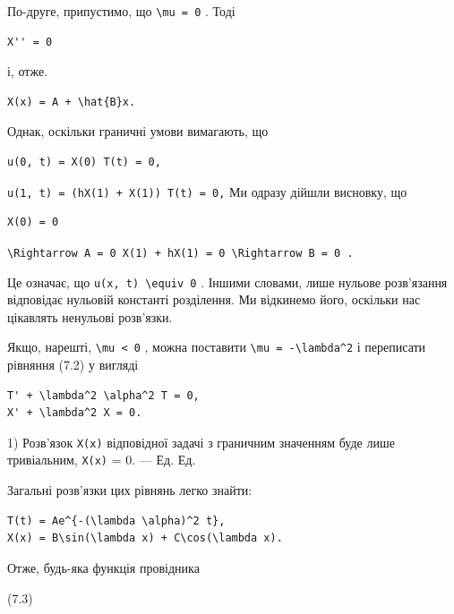 \documentclass[
  ukrainian,
]{article}
\begin{document}
По-друге, припустимо, що \texttt{\textbackslash{}mu\ =\ 0} . Тоді

\begin{verbatim}
X'' = 0
\end{verbatim}

і, отже.

\begin{verbatim}
X(x) = A + \hat{B}x.
\end{verbatim}

Однак, оскільки граничні умови вимагають, що

\begin{verbatim}
u(0, t) = X(0) T(t) = 0,
\end{verbatim}

\texttt{u(1,\ t)\ =\ (hX(1)\ +\ X\textquotesingle{}(1))\ T(t)\ =\ 0,} Ми
одразу дійшли висновку, що

\begin{verbatim}
X(0) = 0
\end{verbatim}

\texttt{\textquotesingle{}\textbackslash{}Rightarrow\ A\ =\ 0\textquotesingle{}\ \textquotesingle{}X\textquotesingle{}(1)\ +\ hX(1)\ =\ 0\textquotesingle{}\ \textquotesingle{}\textbackslash{}Rightarrow\ B\ =\ 0\textquotesingle{}\ .}

Це означає, що \texttt{u(x,\ t)\ \textbackslash{}equiv\ 0} . Іншими
словами, лише нульове розв'язання відповідає нульовій константі
розділення. Ми відкинемо його, оскільки нас цікавлять ненульові
розв'язки.

Якщо, нарешті, \texttt{\textbackslash{}mu\ \textless{}\ 0} , можна
поставити \texttt{\textbackslash{}mu\ =\ -\textbackslash{}lambda\^{}2} і
переписати рівняння (7.2) у вигляді

\begin{verbatim}
T' + \lambda^2 \alpha^2 T = 0,
X' + \lambda^2 X = 0.
\end{verbatim}

1) Розв'язок \texttt{X(x)} відповідної задачі з граничним значенням буде
лише тривіальним, \texttt{X(x)} = 0. --- Ед. Ед.

Загальні розв'язки цих рівнянь легко знайти:

\begin{verbatim}
T(t) = Ae^{-(\lambda \alpha)^2 t},
X(x) = B\sin(\lambda x) + C\cos(\lambda x).
\end{verbatim}

Отже, будь-яка функція провідника

(7.3)
\end{document}
